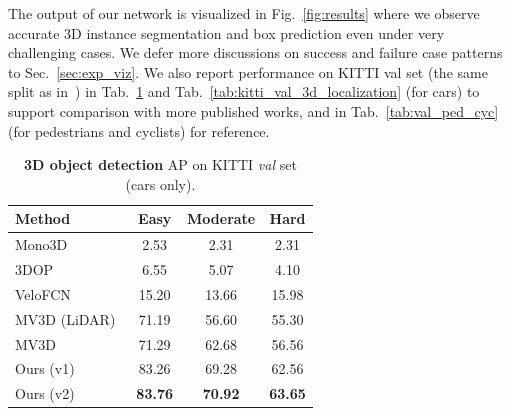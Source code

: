 The output of our network is visualized in Fig.~\ref{fig:results} where we observe accurate 3D instance segmentation and box prediction even under very challenging cases. We defer more discussions on success and failure case patterns to Sec.~\ref{sec:exp_viz}. We also report performance on KITTI val set (the same split as in~\cite{cvpr17chen}) in Tab.~\ref{tab:kitti_val_3d_detection} and Tab.~\ref{tab:kitti_val_3d_localization} (for cars) to support comparison with more published works, and in Tab.~\ref{tab:val_ped_cyc} (for pedestrians and cyclists) for reference.




\begin{table}[t!]
\small
\centering
\label{tab:kitti_valid}
\begin{tabular}{l||ccc}
\hline
Method & Easy    & Moderate    & Hard   \\ \hline
Mono3D~\cite{chen2016monocular} & 2.53 & 2.31 & 2.31 \\ %
3DOP~\cite{chen20153d}  & 6.55 & 5.07 & 4.10 \\ \hline
VeloFCN~\cite{li20163d} & 15.20 & 13.66 & 15.98 \\ %
MV3D (LiDAR)~\cite{cvpr17chen} & 71.19 & 56.60 & 55.30 \\ %
MV3D~\cite{cvpr17chen} & 71.29 & 62.68 & 56.56 \\ \hline
Ours (v1) & 83.26 & 69.28 & 62.56 \\
Ours (v2) & \textbf{83.76} & \textbf{70.92} & \textbf{63.65}\\ \hline
\end{tabular}
\caption{\textbf{3D object detection} AP on KITTI \emph{val} set (cars only).}
\label{tab:kitti_val_3d_detection}
\end{table}


